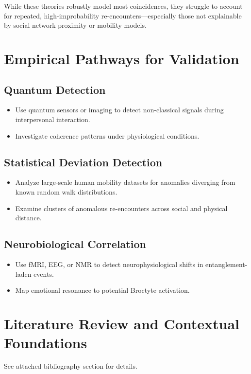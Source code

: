 \documentclass[11pt]{article}
\begin{document}
While these theories robustly model most coincidences, they struggle to account for repeated, high-improbability re-encounters—especially those not explainable by social network proximity or mobility models.

\section{Empirical Pathways for Validation}

\subsection{Quantum Detection}
\begin{itemize}[nosep]
\item Use quantum sensors or imaging to detect non-classical signals during interpersonal interaction.
\item Investigate coherence patterns under physiological conditions.
\end{itemize}

\subsection{Statistical Deviation Detection}
\begin{itemize}[nosep]
\item Analyze large-scale human mobility datasets for anomalies diverging from known random walk distributions.
\item Examine clusters of anomalous re-encounters across social and physical distance.
\end{itemize}

\subsection{Neurobiological Correlation}
\begin{itemize}[nosep]
\item Use fMRI, EEG, or NMR to detect neurophysiological shifts in entanglement-laden events.
\item Map emotional resonance to potential Broctyte activation.
\end{itemize}

\section{Literature Review and Contextual Foundations}

See attached bibliography section for details.
\end{document}

